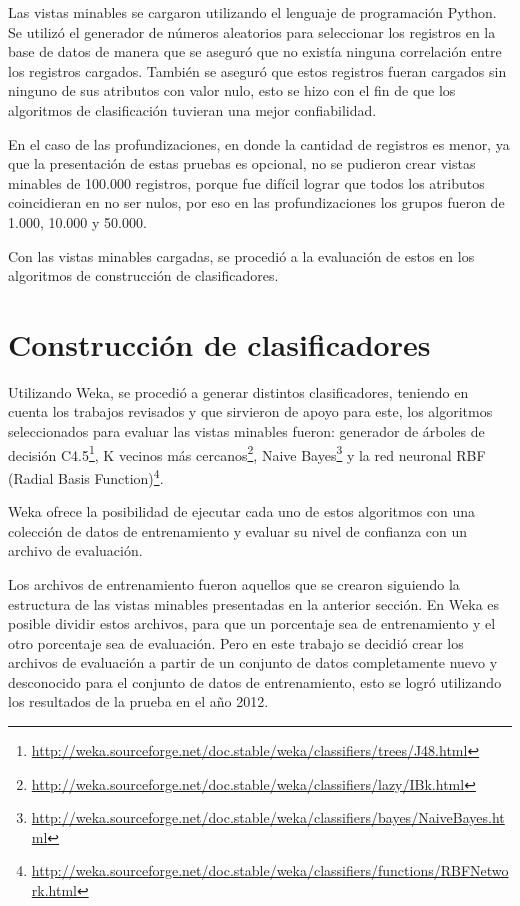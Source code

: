 Las vistas minables se cargaron utilizando el lenguaje de programación Python. Se utilizó el generador de números aleatorios para seleccionar los registros en la base de datos de manera que se aseguró que no existía ninguna correlación entre los registros cargados. También se aseguró que estos registros fueran cargados sin ninguno de sus atributos con valor nulo, esto se hizo con el fin de que los algoritmos de clasificación tuvieran una mejor confiabilidad.

En el caso de las profundizaciones, en donde la cantidad de registros es menor, ya que la presentación de estas pruebas es opcional, no se pudieron crear vistas minables de 100.000 registros, porque fue difícil lograr que todos los atributos coincidieran en no ser nulos, por eso en las profundizaciones los grupos fueron de 1.000, 10.000 y 50.000.

Con las vistas minables cargadas, se procedió a la evaluación de estos en los algoritmos de construcción de clasificadores.
\section{Construcción de clasificadores}
Utilizando Weka, se procedió a generar distintos clasificadores, teniendo en cuenta los trabajos revisados y que sirvieron de apoyo para este, los algoritmos seleccionados para evaluar las vistas minables fueron: generador de árboles de decisión C4.5\footnote{\url{http://weka.sourceforge.net/doc.stable/weka/classifiers/trees/J48.html}}, K vecinos más cercanos\footnote{\url{http://weka.sourceforge.net/doc.stable/weka/classifiers/lazy/IBk.html}}, Naive Bayes\footnote{\url{http://weka.sourceforge.net/doc.stable/weka/classifiers/bayes/NaiveBayes.html}} y la red neuronal RBF (Radial Basis Function)\footnote{\url{ http://weka.sourceforge.net/doc.stable/weka/classifiers/functions/RBFNetwork.html}}.

Weka ofrece la posibilidad de ejecutar cada uno de estos algoritmos con una colección de datos de entrenamiento y evaluar su nivel de confianza con un archivo de evaluación.

Los archivos de entrenamiento fueron aquellos que se crearon siguiendo la estructura de las vistas minables presentadas en la anterior sección. En Weka es posible dividir estos archivos, para que un porcentaje sea de entrenamiento y el otro porcentaje sea de evaluación. Pero en este trabajo se decidió crear los archivos de evaluación a partir de un conjunto de datos completamente nuevo y desconocido para el conjunto de datos de entrenamiento, esto se logró utilizando los resultados de la prueba en el año 2012. 

